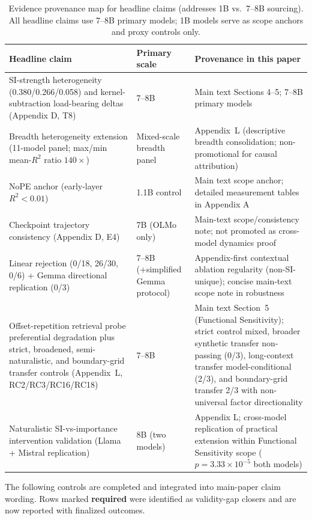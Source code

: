 \documentclass{article}
\begin{document}
\begin{table}[htbp]
\centering
\small
\caption{Evidence provenance map for headline claims (addresses 1B vs.\ 7--8B sourcing). All headline claims use 7--8B primary models; 1B models serve as scope anchors and proxy controls only.}
\label{tab:provenance_map}
\begin{tabular}{p{3.6cm}p{2.9cm}p{4.4cm}}
\toprule
Headline claim & Primary scale & Provenance in this paper \\
\midrule
SI-strength heterogeneity (0.380/0.266/0.058) and kernel-subtraction load-bearing deltas (Appendix D, T8) & 7--8B & Main text Sections 4--5; 7--8B primary models \\
Breadth heterogeneity extension (11-model panel; max/min mean-$R^2$ ratio $140\times$) & Mixed-scale breadth panel & Appendix~L (descriptive breadth consolidation; non-promotional for causal attribution) \\
NoPE anchor (early-layer $R^2<0.01$) & 1.1B control & Main text scope anchor; detailed measurement tables in Appendix A \\
Checkpoint trajectory consistency (Appendix D, E4) & 7B (OLMo only) & Main-text scope/consistency note; not promoted as cross-model dynamics proof \\
Linear rejection (0/18, 26/30, 0/6) + Gemma directional replication (0/3) & 7--8B (+simplified Gemma protocol) & Appendix-first contextual ablation regularity (non-SI-unique); concise main-text scope note in robustness \\
Offset-repetition retrieval probe preferential degradation plus strict, broadened, semi-naturalistic, and boundary-grid transfer controls (Appendix~L, RC2/RC3/RC16/RC18) & 7--8B & Main text Section~5 (Functional Sensitivity); strict control mixed, broader synthetic transfer non-passing (0/3), long-context transfer model-conditional (2/3), and boundary-grid transfer 2/3 with non-universal factor directionality \\
Naturalistic SI-vs-importance intervention validation (Llama + Mistral replication) & 8B (two models) & Appendix L; cross-model replication of practical extension within Functional Sensitivity scope ($p{=}3.33\times10^{-5}$ both models) \\
\bottomrule
\end{tabular}
\end{table}

The following controls are completed and integrated into main-paper claim wording.
Rows marked \textbf{required} were identified as validity-gap closers and are now
reported with finalized outcomes.
\end{document}

